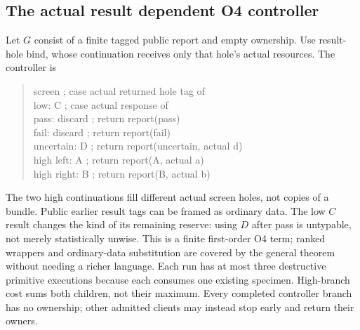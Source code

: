 \subsection{The actual result dependent O4 controller}
Let $G$ consist of a finite tagged public report and empty ownership.
Use result-hole bind, whose continuation receives only that hole's actual
resources. The controller is
\begin{quote}\ttfamily\small
screen ; case actual returned hole tag of\\
\hspace*{1em}low: C ; case actual response of\\
\hspace*{2em}pass: discard ; return report(pass)\\
\hspace*{2em}fail: discard ; return report(fail)\\
\hspace*{2em}uncertain: D ; return report(uncertain, actual d)\\
\hspace*{1em}high left: A ; return report(A, actual a)\\
\hspace*{1em}high right: B ; return report(B, actual b)
\end{quote}
The two high continuations fill different actual screen holes, not copies
of a bundle. Public earlier result tags can be framed as ordinary data.
The low $C$ result changes the kind of its remaining reserve: using $D$
after pass is untypable, not merely statistically unwise. This is a finite
first-order O4 term; ranked wrappers and ordinary-data substitution are
covered by the general theorem without needing a richer language.
Each run has at most three destructive primitive executions because each
consumes one existing specimen. High-branch cost sums both children,
not their maximum. Every completed controller branch has no ownership;
other admitted clients may instead stop early and return their owners.

